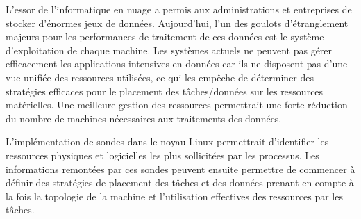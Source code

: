 L’essor de l’informatique en nuage a permis aux administrations et entreprises
de stocker d’énormes jeux de données. Aujourd’hui, l’un des goulots
d’étranglement majeurs pour les performances de traitement de ces données est le
système d’exploitation de chaque machine. Les systèmes actuels ne peuvent pas
gérer efficacement les applications intensives en données car ils ne disposent
pas d’une vue unifiée des ressources utilisées, ce qui les empêche de déterminer
des stratégies efficaces pour le placement des tâches/données sur les ressources
matérielles. Une meilleure gestion des ressources permettrait une forte
réduction du nombre de machines nécessaires aux traitements des données.

L’implémentation de sondes dans le noyau Linux permettrait d'identifier les
ressources physiques et logicielles les plus sollicitées par les processus. Les
informations remontées par ces sondes peuvent ensuite permettre de commencer à
définir des stratégies de placement des tâches et des données prenant en compte
à la fois la topologie de la machine et l’utilisation effectives des ressources
par les tâches.
